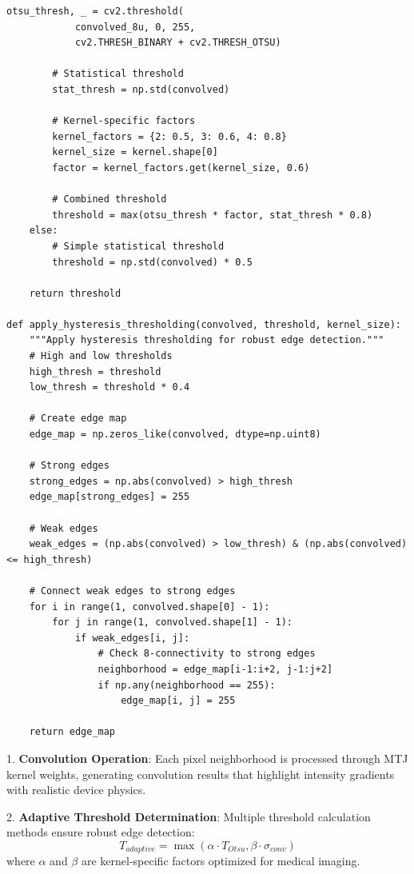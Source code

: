 \documentclass[conference]{IEEEtran}
\begin{document}
\begin{lstlisting}[caption={Complete MTJ edge detection pipeline implementation}]
        otsu_thresh, _ = cv2.threshold(
            convolved_8u, 0, 255, 
            cv2.THRESH_BINARY + cv2.THRESH_OTSU)
        
        # Statistical threshold
        stat_thresh = np.std(convolved)
        
        # Kernel-specific factors
        kernel_factors = {2: 0.5, 3: 0.6, 4: 0.8}
        kernel_size = kernel.shape[0]
        factor = kernel_factors.get(kernel_size, 0.6)
        
        # Combined threshold
        threshold = max(otsu_thresh * factor, stat_thresh * 0.8)
    else:
        # Simple statistical threshold
        threshold = np.std(convolved) * 0.5
    
    return threshold

def apply_hysteresis_thresholding(convolved, threshold, kernel_size):
    """Apply hysteresis thresholding for robust edge detection."""
    # High and low thresholds
    high_thresh = threshold
    low_thresh = threshold * 0.4
    
    # Create edge map
    edge_map = np.zeros_like(convolved, dtype=np.uint8)
    
    # Strong edges
    strong_edges = np.abs(convolved) > high_thresh
    edge_map[strong_edges] = 255
    
    # Weak edges
    weak_edges = (np.abs(convolved) > low_thresh) & (np.abs(convolved) <= high_thresh)
    
    # Connect weak edges to strong edges
    for i in range(1, convolved.shape[0] - 1):
        for j in range(1, convolved.shape[1] - 1):
            if weak_edges[i, j]:
                # Check 8-connectivity to strong edges
                neighborhood = edge_map[i-1:i+2, j-1:j+2]
                if np.any(neighborhood == 255):
                    edge_map[i, j] = 255
    
    return edge_map
\end{lstlisting}

1. \textbf{Convolution Operation}: Each pixel neighborhood is processed through MTJ kernel weights, generating convolution results that highlight intensity gradients with realistic device physics.

2. \textbf{Adaptive Threshold Determination}: Multiple threshold calculation methods ensure robust edge detection:
   \begin{equation}
   T_{adaptive} = \max(\alpha \cdot T_{Otsu}, \beta \cdot \sigma_{conv})
   \end{equation}
   where $\alpha$ and $\beta$ are kernel-specific factors optimized for medical imaging.
\end{document}

